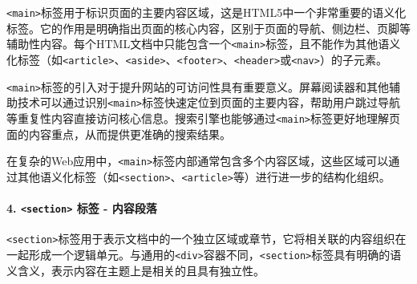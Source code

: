 \texttt{\textless{}main\textgreater{}}标签用于标识页面的主要内容区域，这是HTML5中一个非常重要的语义化标签。它的作用是明确指出页面的核心内容，区别于页面的导航、侧边栏、页脚等辅助性内容。每个HTML文档中只能包含一个\texttt{\textless{}main\textgreater{}}标签，且不能作为其他语义化标签（如\texttt{\textless{}article\textgreater{}}、\texttt{\textless{}aside\textgreater{}}、\texttt{\textless{}footer\textgreater{}}、\texttt{\textless{}header\textgreater{}}或\texttt{\textless{}nav\textgreater{}}）的子元素。

\texttt{\textless{}main\textgreater{}}标签的引入对于提升网站的可访问性具有重要意义。屏幕阅读器和其他辅助技术可以通过识别\texttt{\textless{}main\textgreater{}}标签快速定位到页面的主要内容，帮助用户跳过导航等重复性内容直接访问核心信息。搜索引擎也能够通过\texttt{\textless{}main\textgreater{}}标签更好地理解页面的内容重点，从而提供更准确的搜索结果。

在复杂的Web应用中，\texttt{\textless{}main\textgreater{}}标签内部通常包含多个内容区域，这些区域可以通过其他语义化标签（如\texttt{\textless{}section\textgreater{}}、\texttt{\textless{}article\textgreater{}}等）进行进一步的结构化组织。

\begin{Shaded}
\begin{Highlighting}[]
\DataTypeTok{\textless{}}\DataTypeTok{\textgreater{}}
    \DataTypeTok{\textless{}}\DataTypeTok{\textgreater{}}\DataTypeTok{\textless{}/}\DataTypeTok{\textgreater{}}
    \DataTypeTok{\textless{}}\DataTypeTok{\textgreater{}}\DataTypeTok{\textless{}/}\DataTypeTok{\textgreater{}}
\DataTypeTok{\textless{}/}\DataTypeTok{\textgreater{}}
\end{Highlighting}
\end{Shaded}

\paragraph{\texorpdfstring{4. \texttt{\textless{}section\textgreater{}} 标签 - 内容段落}{4. \textless section\textgreater{} 标签 - 内容段落}}\label{section-ux6807ux7b7e---ux5185ux5bb9ux6bb5ux843d}

\texttt{\textless{}section\textgreater{}}标签用于表示文档中的一个独立区域或章节，它将相关联的内容组织在一起形成一个逻辑单元。与通用的\texttt{\textless{}div\textgreater{}}容器不同，\texttt{\textless{}section\textgreater{}}标签具有明确的语义含义，表示内容在主题上是相关的且具有独立性。

